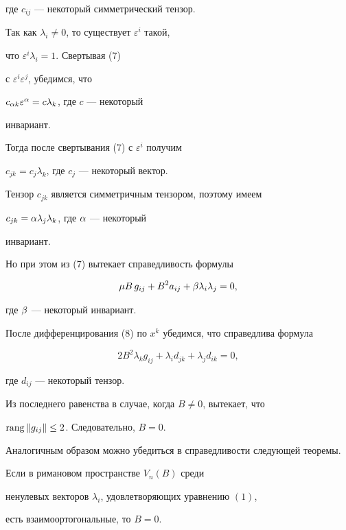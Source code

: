 \begin{pf}
где $c_{ij}$ --- некоторый симметрический тензор.


Так как $\lambda_{i}\neq0$, то существует $\varepsilon^i$ такой,


что $\varepsilon^i\lambda_i=1$. Свертывая (7) 


с $\varepsilon^i\varepsilon^j$, убедимся, что


$c_{\alpha k}\varepsilon^\alpha=c \lambda_k$, где $c$ --- некоторый


инвариант. 


Тогда после свертывания (7) с $\varepsilon^i$ получим


$c_{jk}=c_j\lambda_k$, где $c_j$ --- некоторый вектор.


Тензор $c_{jk}$ является симметричным тензором, поэтому имеем


$c_{jk}=\alpha\lambda_j\lambda_k$, где $\alpha$ --- некоторый


инвариант. 


Но при этом из (7) вытекает справедливость формулы


\begin{equation}


\mu B\,g_{ij}+ B^2 a_{ij}+\b\lambda_i\lambda_j=0,


\end{equation}


где $\beta$ --- некоторый инвариант.





После дифференцирования (8) по $x^k$ убедимся, что справедлива формула


$$


2B^2\lambda_k g_{ij}+\lambda_i d_{jk}+\lambda_j d_{ik}=0,


$$


где $d_{ij}$ --- некоторый тензор.





Из последнего равенства в случае, когда $B\neq0$, вытекает, что


$\operatorname{rang}\| g_{ij}\|\leq2$. Следовательно, $B=0$.


\end{pf}





Аналогичным образом можно убедиться в справедливости следующей теоремы.





\begin{thm}


Если в римановом пространстве $V_n(B)$  среди


ненулевых векторов $\lambda_i$, удовлетворяющих уравнению $(1)$, 


есть взаимоортогональные, то $B=0$.


\end{thm}








